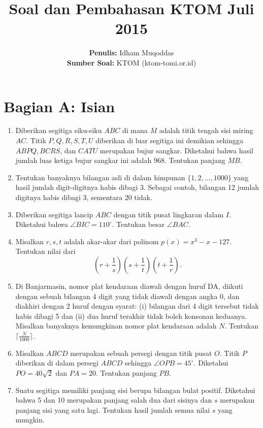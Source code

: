 \documentclass[11pt, a4paper]{article}
\title{\textbf{Soal dan Pembahasan KTOM Juli 2015}}
\author{\textbf{Penulis:} Idham Muqoddas \\ \textbf{Sumber Soal:} KTOM (ktom-tomi.or.id)}
\date{}
\begin{document}
\maketitle

\section*{Bagian A: Isian}

\begin{enumerate}[label=\textbf{No. \arabic*}, leftmargin=*]
    \item Diberikan segitiga siku-siku $ABC$ di mana $M$ adalah titik tengah sisi miring $AC$. Titik $P, Q, R, S, T, U$ diberikan di luar segitiga ini demikian sehingga $ABPQ, BCRS$, dan $CATU$ merupakan bujur sangkar. Diketahui bahwa hasil jumlah luas ketiga bujur sangkar ini adalah 968. Tentukan panjang $MB$.

    \item Tentukan banyaknya bilangan asli di dalam himpunan $\{1, 2, \dots, 1000\}$ yang hasil jumlah digit-digitnya habis dibagi 3. Sebagai contoh, bilangan 12 jumlah digitnya habis dibagi 3, sementara 20 tidak.

    \item Diberikan segitiga lancip $ABC$ dengan titik pusat lingkaran dalam $I$. Diketahui bahwa $\angle BIC = 110^\circ$. Tentukan besar $\angle BAC$.

    \item Misalkan $r, s, t$ adalah akar-akar dari polinom $p(x) = x^3 - x - 127$. Tentukan nilai dari
    \[ \left(r + \frac{1}{s}\right) \left(s + \frac{1}{t}\right) \left(t + \frac{1}{r}\right). \]

    \item Di Banjarmasin, nomor plat kendaraan diawali dengan huruf DA, diikuti dengan sebuah bilangan 4 digit yang tidak diawali dengan angka 0, dan diakhiri dengan 2 huruf dengan syarat:
    (i) bilangan dari 4 digit tersebut tidak habis dibagi 5 dan
    (ii) dua huruf terakhir tidak boleh konsonan keduanya.
    Misalkan banyaknya kemungkinan nomor plat kendaraan adalah $N$. Tentukan $\lceil \frac{N}{1000} \rceil$.

    \item Misalkan $ABCD$ merupakan sebuah persegi dengan titik pusat $O$. Titik $P$ diberikan di dalam persegi $ABCD$ sehingga $\angle OPB = 45^\circ$. Diketahui $PO = 40\sqrt{2}$ dan $PA = 20$. Tentukan panjang $PB$.

    \item Suatu segitiga memiliki panjang sisi berupa bilangan bulat positif. Diketahui bahwa 5 dan 10 merupakan panjang salah dua dari sisinya dan $s$ merupakan panjang sisi yang satu lagi. Tentukan hasil jumlah semua nilai $s$ yang mungkin.


\end{enumerate}
\end{document}
